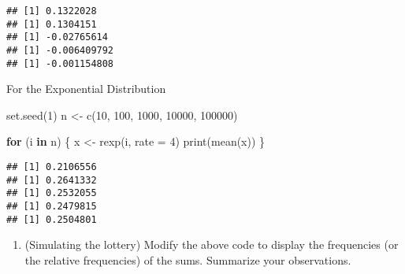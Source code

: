 \documentclass[
]{article}
\newenvironment{Shaded}{\begin{snugshade}}{\end{snugshade}}
\newcommand{\AttributeTok}[1]{\textcolor[rgb]{0.77,0.63,0.00}{#1}}
\newcommand{\ControlFlowTok}[1]{\textcolor[rgb]{0.13,0.29,0.53}{\textbf{#1}}}
\newcommand{\DecValTok}[1]{\textcolor[rgb]{0.00,0.00,0.81}{#1}}
\newcommand{\FunctionTok}[1]{\textcolor[rgb]{0.00,0.00,0.00}{#1}}
\newcommand{\NormalTok}[1]{#1}
\newcommand{\OtherTok}[1]{\textcolor[rgb]{0.56,0.35,0.01}{#1}}
\providecommand{\tightlist}{%
  \setlength{\itemsep}{0pt}\setlength{\parskip}{0pt}}
\begin{document}
\begin{verbatim}
## [1] 0.1322028
## [1] 0.1304151
## [1] -0.02765614
## [1] -0.006409792
## [1] -0.001154808
\end{verbatim}

For the Exponential Distribution

\begin{Shaded}
\begin{Highlighting}[]
\FunctionTok{set.seed}\NormalTok{(}\DecValTok{1}\NormalTok{)}
\NormalTok{n }\OtherTok{\textless{}{-}} \FunctionTok{c}\NormalTok{(}\DecValTok{10}\NormalTok{, }\DecValTok{100}\NormalTok{, }\DecValTok{1000}\NormalTok{, }\DecValTok{10000}\NormalTok{, }\DecValTok{100000}\NormalTok{)}

\ControlFlowTok{for}\NormalTok{ (i }\ControlFlowTok{in}\NormalTok{ n) \{}
\NormalTok{  x }\OtherTok{\textless{}{-}} \FunctionTok{rexp}\NormalTok{(i, }\AttributeTok{rate =} \DecValTok{4}\NormalTok{)}
  \FunctionTok{print}\NormalTok{(}\FunctionTok{mean}\NormalTok{(x))}
\NormalTok{\}}
\end{Highlighting}
\end{Shaded}

\begin{verbatim}
## [1] 0.2106556
## [1] 0.2641332
## [1] 0.2532055
## [1] 0.2479815
## [1] 0.2504801
\end{verbatim}

\begin{enumerate}
\def\labelenumi{\arabic{enumi}.}
\setcounter{enumi}{2}
\tightlist
\item
  (Simulating the lottery) Modify the above code to display the
  frequencies (or the relative frequencies) of the sums. Summarize your
  observations.
\end{enumerate}
\end{document}
